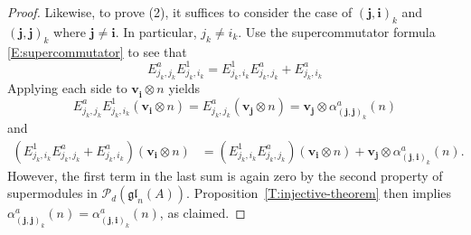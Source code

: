 \documentclass[11pt,reqno]{amsart} %
\newcommand{\gl}{\mathfrak{gl}}
\newcommand{\0}{\bar{0}}
\newcommand{\1}{\bar{1}}
\newcommand{\bv}{\mathbf{v}}
\newcommand{\bi}{\mathbf{i}}
\newcommand{\bj}{\mathbf{j}}
\newcommand{\Itwo}{\tilde{I}^{2}(n,d)}
\newcommand{\Pol}{\mathcal{P}}
\numberwithin{equation}{subsection}
\begin{document}
\begin{proof}
Likewise, to prove (2), it suffices to consider the case of $(\bj, \bi)_{k}$ and $(\bj, \bj )_{k}$ where $\bj \neq \bi$.  In particular, $j_{k} \neq i_{k}$.  Use the supercommutator formula \eqref{E:supercommutator} to see that 
\[
E^{a}_{j_{k}, j_{k}}E^{1}_{j_{k}, i_{k}} = E^{1}_{j_{k}, i_{k}}E^{a}_{j_{k}, j_{k}} + E^{a}_{j_{k}, i_{k}}
\]  Applying each side to $ \bv_{\bi}^{} \otimes n$ yields
\[
E^{a}_{j_{k}, j_{k}}E^{1}_{j_{k}, i_{k}}( \bv_{\bi}^{} \otimes n) = E^{a}_{j_{k}, j_{k}}\left( \bv_{\bj}^{} \otimes n \right) =  \bv_{\bj}^{} \otimes \alpha_{(\bj , \bj)_{k}}^{a} (n)
\]
and 
\begin{align*}
\left( E^{1}_{j_{k}, i_{k}}E^{a}_{j_{k}, j_{k}} + E^{a}_{j_{k}, i_{k}}\right)( \bv_{\bi} \otimes n) &= \left( E^{1}_{j_{k}, i_{k}}E^{a}_{j_{k}, j_{k}}\right)( \bv_{\bi} \otimes n) +  \bv_{\bj} \otimes  \alpha_{(\bj, \bi)_{k}}^{a}(n).
\end{align*}  However, the first term in the last sum is again zero by the second property of supermodules in $\Pol_{d}(\gl_{n}(A))$.  Proposition~\ref{T:injective-theorem} then implies $\alpha_{(\bj , \bj)_{k}}^{a} (n) = \alpha_{(\bj, \bi)_{k}}^{a}(n)$, as claimed.

\end{proof}
\end{document}
